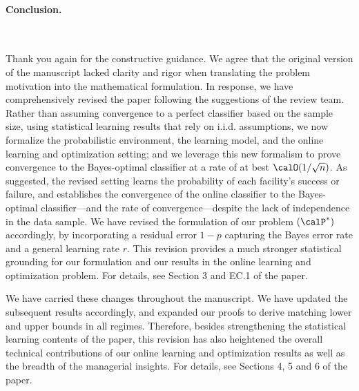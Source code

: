 \documentclass[11pt]{article}
\begin{document}
\paragraph{Conclusion.}\

Thank you again for the constructive guidance. We agree that the original version of the manuscript lacked clarity and rigor when translating the problem motivation into the mathematical formulation. In response, we have comprehensively revised the paper following the suggestions of the review team. Rather than assuming convergence to a perfect classifier based on the sample size, using statistical learning results that rely on i.i.d. assumptions, we now formalize the probabilistic environment, the learning model, and the online learning and optimization setting; and we leverage this new formalism to prove convergence to the Bayes-optimal classifier at a rate of at best $\calO(1/\sqrt n)$. As suggested, the revised setting learns the probability of each facility's success or failure, and establishes the convergence of the online classifier to the Bayes-optimal classifier---and the rate of convergence---despite the lack of independence in the data sample. We have revised the formulation of our problem $(\calP^*)$ accordingly, by incorporating a residual error $1-p$ capturing the Bayes error rate and a general learning rate $r$. This revision provides a much stronger statistical grounding for our formulation and our results in the online learning and optimization problem. For details, see Section 3 and EC.1 of the paper.

We have carried these changes throughout the manuscript. We have updated the subsequent results accordingly, and expanded our proofs to derive matching lower and upper bounds in all regimes. Therefore, besides strengthening the statistical learning contents of the paper, this revision has also heightened the overall technical contributions of our online learning and optimization results as well as the breadth of the managerial insights. For details, see Sections 4, 5 and 6 of the paper.
\end{document}
